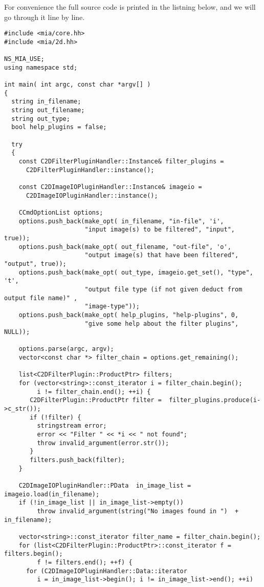\documentclass[english, 10pt, a4paper,headsepline,openany]{scrbook}
\begin{document}
For convenience the full source code is printed in the listning below, and we will go through it line by line. 
\lstset{language=c++}
\begin{lstlisting}
#include <mia/core.hh>
#include <mia/2d.hh>

NS_MIA_USE; 
using namespace std; 

int main( int argc, const char *argv[] )
{
  string in_filename;
  string out_filename;
  string out_type; 
  bool help_plugins = false; 

  try 
  {
    const C2DFilterPluginHandler::Instance& filter_plugins = 
      C2DFilterPluginHandler::instance();
  
    const C2DImageIOPluginHandler::Instance& imageio = 
      C2DImageIOPluginHandler::instance();
  
    CCmdOptionList options;  
    options.push_back(make_opt( in_filename, "in-file", 'i', 
                      "input image(s) to be filtered", "input", true)); 
    options.push_back(make_opt( out_filename, "out-file", 'o', 
                      "output image(s) that have been filtered", "output", true)); 
    options.push_back(make_opt( out_type, imageio.get_set(), "type", 't',
                      "output file type (if not given deduct from output file name)" , 
                      "image-type"));
    options.push_back(make_opt( help_plugins, "help-plugins", 0, 
                      "give some help about the filter plugins", NULL)); 

    options.parse(argc, argv); 
    vector<const char *> filter_chain = options.get_remaining(); 

    list<C2DFilterPlugin::ProductPtr> filters;
    for (vector<string>::const_iterator i = filter_chain.begin(); 
         i != filter_chain.end(); ++i) {
       C2DFilterPlugin::ProductPtr filter =  filter_plugins.produce(i->c_str()); 
       if (!filter) {
         stringstream error; 
         error << "Filter " << *i << " not found"; 
         throw invalid_argument(error.str());
       }
       filters.push_back(filter);
    }

    C2DImageIOPluginHandler::PData  in_image_list = imageio.load(in_filename);  
    if (!in_image_list || in_image_list->empty())
         throw invalid_argument(string("No images found in ")  + in_filename);

    vector<string>::const_iterator filter_name = filter_chain.begin();
    for (list<C2DFilterPlugin::ProductPtr>::const_iterator f = filters.begin(); 
         f != filters.end(); ++f) {
      for (C2DImageIOPluginHandler::Data::iterator   
         i = in_image_list->begin(); i != in_image_list->end(); ++i)
    

\end{lstlisting}
\end{document}
